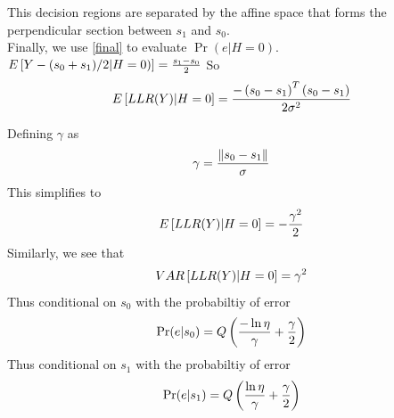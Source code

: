 \begin{enumerate}
This decision regions are separated  by the affine space that forms the perpendicular section between $s_1$ and $s_0$. \\
Finally, we use \ref{final} to evaluate 
$\Pr(e | H =0)$. $E{}\left[ Y -(s_0 +s_1)/2|H=0)\right] = \frac{s_1 -s_0}{2}$ So
\begin{align}
E{}\left[LLR(Y)|H=0\right] = \frac{-\left(s_0 -s_1\right)^T\left(s_0 -s_1\right)}{2\sigma^2}
\end{align}





Defining $\gamma$ as
\begin{align}
\gamma = \frac{\left\lVert s_0 -s_1\right\rVert}{\sigma}
\end{align}
This simplifies to
\begin{align}
E{}\left[LLR(Y)|H=0\right] = -\frac{\gamma^2}{2}
\end{align} 
Similarly, we see that
\begin{align}
VAR{}\left[LLR(Y)|H=0\right] = \gamma^2
\end{align}
Thus conditional on $s_0$ with the probabiltiy of error 
\begin{align}
\Pr(e |s_0) = Q\left(\frac{-\ln{\eta}}{\gamma}+\frac{\gamma}{2}\right)
\end{align}
Thus conditional on $s_1$ with the probabiltiy of error 
\begin{align}
\Pr(e |s_1) = Q\left(\frac{\ln{\eta}}{\gamma}+\frac{\gamma}{2}\right)
\end{align}




\end{enumerate}

